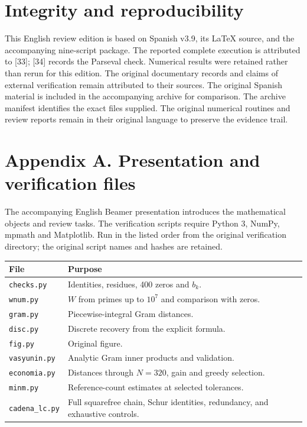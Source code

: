 \documentclass[11pt,a4paper]{article}
\newenvironment{tabla}{\par\smallskip\small}{\par\smallskip}
\begin{document}
\section*{Integrity and reproducibility}
This English review edition is based on Spanish v3.9, its LaTeX source, and the accompanying nine-script package. The reported complete execution is attributed to [33]; [34] records the Parseval check. Numerical results were retained rather than rerun for this edition. The original documentary records and claims of external verification remain attributed to their sources. The original Spanish material is included in the accompanying archive for comparison. The archive manifest identifies the exact files supplied. The original numerical routines and review reports remain in their original language to preserve the evidence trail.
\clearpage\section*{Appendix A. Presentation and verification files}
The accompanying English Beamer presentation introduces the mathematical objects and review tasks. The verification scripts require Python 3, NumPy, mpmath and Matplotlib. Run in the listed order from the original verification directory; the original script names and hashes are retained.
\begin{tabla}\begin{xltabular}{\linewidth}{@{}P{4.0cm}L@{}}\toprule
File&Purpose\\\midrule\endhead
\texttt{checks.py}&Identities, residues, 400 zeros and $b_k$.\\
\texttt{wnum.py}&$W$ from primes up to $10^7$ and comparison with zeros.\\
\texttt{gram.py}&Piecewise-integral Gram distances.\\
\texttt{disc.py}&Discrete recovery from the explicit formula.\\
\texttt{fig.py}&Original figure.\\
\texttt{vasyunin.py}&Analytic Gram inner products and validation.\\
\texttt{economia.py}&Distances through $N=320$, gain and greedy selection.\\
\texttt{minm.py}&Reference-count estimates at selected tolerances.\\
\texttt{cadena\_lc.py}&Full squarefree chain, Schur identities, redundancy, and exhaustive controls.\\\bottomrule\end{xltabular}\end{tabla}
\end{document}
